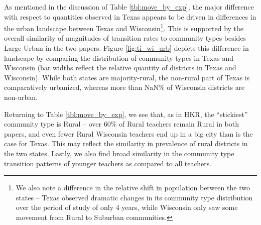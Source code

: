 \documentclass[12pt,]{article}
\let\rmarkdownfootnote\footnote%
\def\footnote{\protect\rmarkdownfootnote}
\begin{document}
As mentioned in the discussion of Table \ref{tbl:move_by_exp}, the major
difference with respect to quantities observed in Texas appears to be
driven in differences in the urban landscape between Texas and
Wisconsin\footnote{We also note a difference in the relative shift in
  population between the two states -- Texas observed dramatic changes
  in its community type distribution over the period of study of only 4
  years, while Wisconsin only saw some movement from Rural to Suburban
  communities.}. This is supported by the overall similarity of
magnitudes of transition rates to community types besides Large Urban in
the two papers. Figure \ref{fig:ti_wi_urb} depicts this difference in
landscape by comparing the distribution of community types in Texas and
Wisconsin (bar widths reflect the relative quantity of districts in
Texas and Wisconsin). While both states are majority-rural, the
non-rural part of Texas is comparatively urbanized, whereas more than
NaN\% of Wisconsin districts are non-urban.

Returning to Table \ref{tbl:move_by_exp}, we see that, as in HKR, the
``stickiest'' community type is Rural -- over 60\% of Rural teachers
remain Rural in both papers, and even fewer Rural Wisconsin teachers end
up in a big city than is the case for Texas. This may reflect the
similarity in prevalence of rural districts in the two states. Lastly,
we also find broad similarity in the community type transition patterns
of younger teachers as compared to all teachers.
\end{document}
